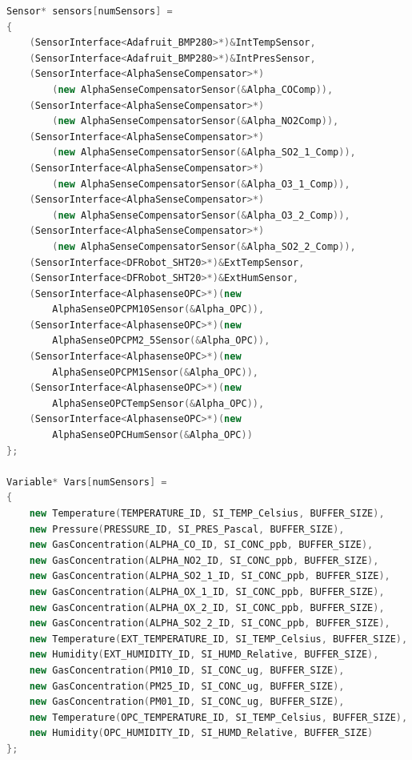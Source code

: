 \begin{lstlisting}[language=C++, caption=Declaração das listas de sensores e variáveis]
Sensor* sensors[numSensors] = 
{
    (SensorInterface<Adafruit_BMP280>*)&IntTempSensor,
    (SensorInterface<Adafruit_BMP280>*)&IntPresSensor,
    (SensorInterface<AlphaSenseCompensator>*)
        (new AlphaSenseCompensatorSensor(&Alpha_COComp)),
    (SensorInterface<AlphaSenseCompensator>*)
        (new AlphaSenseCompensatorSensor(&Alpha_NO2Comp)),
    (SensorInterface<AlphaSenseCompensator>*)
        (new AlphaSenseCompensatorSensor(&Alpha_SO2_1_Comp)),
    (SensorInterface<AlphaSenseCompensator>*)
        (new AlphaSenseCompensatorSensor(&Alpha_O3_1_Comp)),
    (SensorInterface<AlphaSenseCompensator>*)
        (new AlphaSenseCompensatorSensor(&Alpha_O3_2_Comp)),
    (SensorInterface<AlphaSenseCompensator>*)
        (new AlphaSenseCompensatorSensor(&Alpha_SO2_2_Comp)),
    (SensorInterface<DFRobot_SHT20>*)&ExtTempSensor,
    (SensorInterface<DFRobot_SHT20>*)&ExtHumSensor,
    (SensorInterface<AlphasenseOPC>*)(new 
        AlphaSenseOPCPM10Sensor(&Alpha_OPC)),
    (SensorInterface<AlphasenseOPC>*)(new 
        AlphaSenseOPCPM2_5Sensor(&Alpha_OPC)),
    (SensorInterface<AlphasenseOPC>*)(new 
        AlphaSenseOPCPM1Sensor(&Alpha_OPC)),
    (SensorInterface<AlphasenseOPC>*)(new 
        AlphaSenseOPCTempSensor(&Alpha_OPC)),
    (SensorInterface<AlphasenseOPC>*)(new 
        AlphaSenseOPCHumSensor(&Alpha_OPC))
};

Variable* Vars[numSensors] = 
{ 
    new Temperature(TEMPERATURE_ID, SI_TEMP_Celsius, BUFFER_SIZE),
    new Pressure(PRESSURE_ID, SI_PRES_Pascal, BUFFER_SIZE),
    new GasConcentration(ALPHA_CO_ID, SI_CONC_ppb, BUFFER_SIZE),
    new GasConcentration(ALPHA_NO2_ID, SI_CONC_ppb, BUFFER_SIZE),
    new GasConcentration(ALPHA_SO2_1_ID, SI_CONC_ppb, BUFFER_SIZE),
    new GasConcentration(ALPHA_OX_1_ID, SI_CONC_ppb, BUFFER_SIZE),
    new GasConcentration(ALPHA_OX_2_ID, SI_CONC_ppb, BUFFER_SIZE),
    new GasConcentration(ALPHA_SO2_2_ID, SI_CONC_ppb, BUFFER_SIZE),
    new Temperature(EXT_TEMPERATURE_ID, SI_TEMP_Celsius, BUFFER_SIZE),
    new Humidity(EXT_HUMIDITY_ID, SI_HUMD_Relative, BUFFER_SIZE),
    new GasConcentration(PM10_ID, SI_CONC_ug, BUFFER_SIZE),
    new GasConcentration(PM25_ID, SI_CONC_ug, BUFFER_SIZE),
    new GasConcentration(PM01_ID, SI_CONC_ug, BUFFER_SIZE),
    new Temperature(OPC_TEMPERATURE_ID, SI_TEMP_Celsius, BUFFER_SIZE),
    new Humidity(OPC_HUMIDITY_ID, SI_HUMD_Relative, BUFFER_SIZE)
};
\end{lstlisting}
\label{code:sensors-and-vars}

